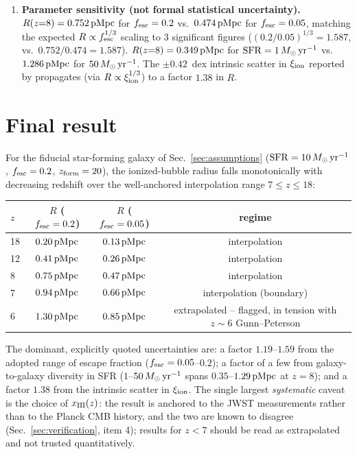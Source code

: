 \documentclass[11pt,a4paper]{article}
\newcommand{\pMpc}{\,{\rm pMpc}}
\newcommand{\Msun}{\,M_\odot}
\begin{document}
\begin{enumerate}
      rather than hidden: $R_{b,\rm Umeda}$ traces a merged bubble around a clustered galaxy overdensity, not
      the Str\"omgren sphere of one isolated galaxy, exactly the tension already noted qualitatively in the
      ``Known tensions'' paragraph of \texttt{stromgren\_sphere\_summary.tex}.
\item \textbf{Parameter sensitivity (not formal statistical uncertainty).}
      $R(z{=}8)=0.752\pMpc$ for $f_{\rm esc}=0.2$ vs.\ $0.474\pMpc$ for $f_{\rm esc}=0.05$, matching the
      expected $R\propto f_{\rm esc}^{1/3}$ scaling to 3 significant figures
      ($(0.2/0.05)^{1/3}=1.587$, vs.\ $0.752/0.474=1.587$).
      $R(z{=}8)=0.349\pMpc$ for $\mathrm{SFR}=1\Msun\,{\rm yr^{-1}}$ vs.\ $1.286\pMpc$ for
      $50\Msun\,{\rm yr^{-1}}$. The $\pm0.42$~dex intrinsic scatter in $\xi_{\rm ion}$ reported by
      \citet{Llerena2024} propagates (via $R\propto\xi_{\rm ion}^{1/3}$) to a factor $1.38$ in $R$.
\end{enumerate}

\section{Final result}
\label{sec:final}

For the fiducial star-forming galaxy of Sec.~\ref{sec:assumptions}
($\mathrm{SFR}=10\Msun\,{\rm yr^{-1}}$, $f_{\rm esc}=0.2$, $z_{\rm form}=20$), the ionized-bubble radius
falls monotonically with decreasing redshift over the well-anchored interpolation range $7\le z\le18$:
\begin{center}
\begin{tabular}{@{}lccc@{}}
\toprule
$z$ & $R$ ($f_{\rm esc}=0.2$) & $R$ ($f_{\rm esc}=0.05$) & regime \\
\midrule
18 & $0.20\pMpc$ & $0.13\pMpc$ & interpolation \\
12 & $0.41\pMpc$ & $0.26\pMpc$ & interpolation \\
8  & $0.75\pMpc$ & $0.47\pMpc$ & interpolation \\
7  & $0.94\pMpc$ & $0.66\pMpc$ & interpolation (boundary) \\
6  & $1.30\pMpc$ & $0.85\pMpc$ & extrapolated -- flagged, in tension with $z\sim6$ Gunn--Peterson \\
\bottomrule
\end{tabular}
\end{center}
The dominant, explicitly quoted uncertainties are: a factor $1.19$--$1.59$ from the adopted range of
escape fraction ($f_{\rm esc}=0.05$--$0.2$); a factor of a few from galaxy-to-galaxy diversity in SFR
($1$--$50\Msun\,{\rm yr^{-1}}$ spans $0.35$--$1.29\pMpc$ at $z=8$); and a factor $1.38$ from the intrinsic
scatter in $\xi_{\rm ion}$. The single largest \emph{systematic} caveat is the choice of $x_{\rm HI}(z)$: the
result is anchored to the \citet{Umeda2023} JWST measurements rather than to the Planck CMB history, and the
two are known to disagree (Sec.~\ref{sec:verification}, item 4); results for $z<7$ should be read as
extrapolated and not trusted quantitatively.
\end{document}
